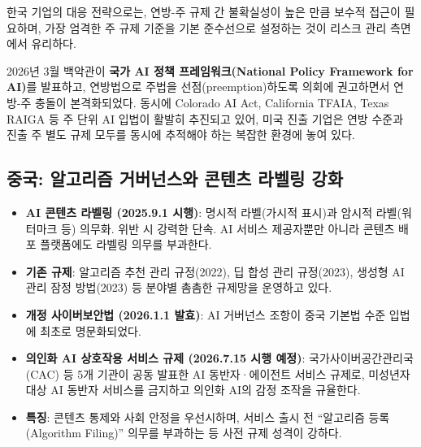 한국 기업의 대응 전략으로는, 연방-주 규제 간 불확실성이 높은 만큼 보수적 접근이 필요하며, 가장 엄격한 주 규제 기준을 기본 준수선으로 설정하는 것이 리스크 관리 측면에서 유리하다.

2026년 3월 백악관이 \textbf{국가 AI 정책 프레임워크(National Policy Framework for AI)}를 발표하고, 연방법으로 주법을 선점(preemption)하도록 의회에 권고하면서 연방-주 충돌이 본격화되었다. 동시에 Colorado AI Act, California TFAIA, Texas RAIGA 등 주 단위 AI 입법이 활발히 추진되고 있어, 미국 진출 기업은 연방 수준과 진출 주 별도 규제 모두를 동시에 추적해야 하는 복잡한 환경에 놓여 있다.

\subsection{중국: 알고리즘 거버넌스와 콘텐츠 라벨링 강화}
\begin{itemize}
 \item \textbf{AI 콘텐츠 라벨링 (2025.9.1 시행)}: 명시적 라벨(가시적 표시)과 암시적 라벨(워터마크 등) 의무화. 위반 시 강력한 단속. AI 서비스 제공자뿐만 아니라 콘텐츠 배포 플랫폼에도 라벨링 의무를 부과한다.
 \item \textbf{기존 규제}: 알고리즘 추천 관리 규정(2022), 딥 합성 관리 규정(2023), 생성형 AI 관리 잠정 방법(2023) 등 분야별 촘촘한 규제망을 운영하고 있다.
 \item \textbf{개정 사이버보안법 (2026.1.1 발효)}: AI 거버넌스 조항이 중국 기본법 수준 입법에 최초로 명문화되었다.
 \item \textbf{의인화 AI 상호작용 서비스 규제 (2026.7.15 시행 예정)}: 국가사이버공간관리국(CAC) 등 5개 기관이 공동 발표한 AI 동반자·에이전트 서비스 규제로, 미성년자 대상 AI 동반자 서비스를 금지하고 의인화 AI의 감정 조작을 규율한다.
 \item \textbf{특징}: 콘텐츠 통제와 사회 안정을 우선시하며, 서비스 출시 전 ``알고리즘 등록(Algorithm Filing)'' 의무를 부과하는 등 사전 규제 성격이 강하다.\cite{roberts2021chinese}
\end{itemize}

